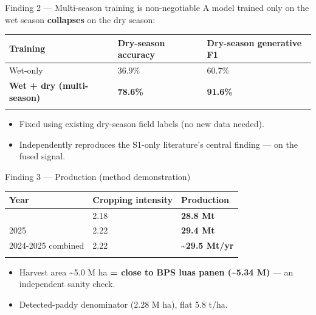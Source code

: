 \documentclass[
  ignorenonframetext,
  aspectratio=169,
]{beamer}
\providecommand{\tightlist}{%
  \setlength{\itemsep}{0pt}\setlength{\parskip}{0pt}}
\begin{document}
\begin{frame}{Finding 2 --- Multi-season training is non-negotiable}
\label{finding-2-multi-season-training-is-non-negotiable}
A model trained only on the wet season \textbf{collapses} on the dry
season:

\begin{longtable}[]{@{}lll@{}}
\toprule\noalign{}
Training & Dry-season accuracy & Dry-season generative F1 \\
\midrule\noalign{}
\endhead
Wet-only & 36.9\% & 60.7\% \\
\textbf{Wet + dry (multi-season)} & \textbf{78.6\%} & \textbf{91.6\%} \\
\bottomrule\noalign{}
\end{longtable}

\begin{itemize}
\tightlist
\item
  Fixed using existing dry-season field labels (no new data needed).
\item
  Independently reproduces the S1-only literature's central finding ---
  on the fused signal.
\end{itemize}
\end{frame}

\begin{frame}{Finding 3 --- Production (method demonstration)}
\label{finding-3-production-method-demonstration}
\begin{longtable}[]{@{}lll@{}}
\toprule\noalign{}
Year & Cropping intensity & Production \\
\midrule\noalign{}
\endhead
2024 & 2.18 & \textbf{28.8 Mt} \\
2025 & 2.22 & \textbf{29.4 Mt} \\
2024-2025 combined & 2.22 & \textbf{\textasciitilde29.5 Mt/yr} \\
\bottomrule\noalign{}
\end{longtable}

\begin{itemize}
\tightlist
\item
  Harvest area \textasciitilde5.0 M ha \textbf{= close to BPS luas panen
  (\textasciitilde5.34 M)} --- an independent sanity check.
\item
  Detected-paddy denominator (2.28 M ha), flat 5.8 t/ha.
\end{itemize}
\end{frame}
\end{document}
